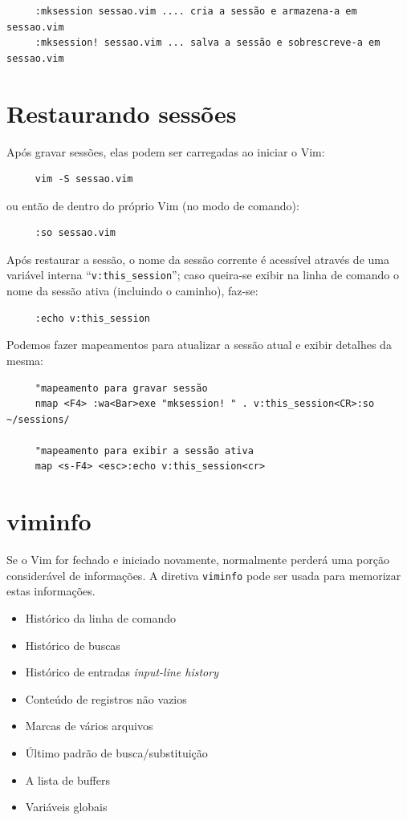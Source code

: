 \documentclass[10pt,a4paper,openany]{book}
\begin{document}
\begin{verbatim}
     :mksession sessao.vim .... cria a sessão e armazena-a em sessao.vim
     :mksession! sessao.vim ... salva a sessão e sobrescreve-a em sessao.vim
\end{verbatim}

\section{Restaurando sessões}

Após gravar sessões, elas podem ser carregadas ao iniciar o Vim:

\begin{verbatim}
     vim -S sessao.vim
\end{verbatim}

ou então de dentro do próprio Vim (no modo de comando):

\begin{verbatim}
     :so sessao.vim
\end{verbatim}

Após restaurar a sessão, o nome da sessão corrente é acessível através de uma
variável interna ``\verb+v:this_session+''; caso queira-se exibir na linha de
comando o nome da sessão ativa (incluindo o caminho), faz-se:

\begin{verbatim}
     :echo v:this_session
\end{verbatim}

Podemos fazer mapeamentos para atualizar a sessão atual e exibir detalhes da
mesma:

\begin{verbatim}
     "mapeamento para gravar sessão
     nmap <F4> :wa<Bar>exe "mksession! " . v:this_session<CR>:so ~/sessions/

     "mapeamento para exibir a sessão ativa
     map <s-F4> <esc>:echo v:this_session<cr>
\end{verbatim}

\section{viminfo}

Se o Vim for fechado e iniciado novamente, normalmente perderá uma 
porção considerável de informações. A diretiva {\tt viminfo} pode ser usada
para memorizar estas informações.

\begin{itemize}
\item Histórico da linha de comando
\item Histórico de buscas
\item Histórico de entradas {\em input-line history}
\item Conteúdo de registros não vazios
\item Marcas de vários arquivos
\item Último padrão de busca/substituição 
\item A lista de buffers
\item Variáveis globais
\end{itemize}
\end{document}
